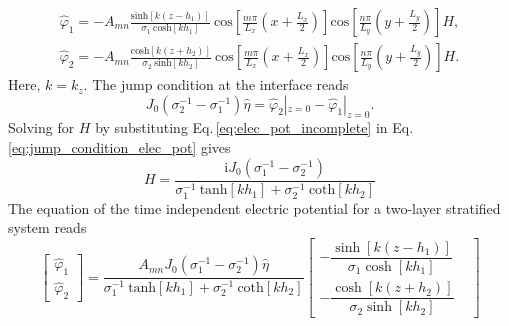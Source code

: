 \documentclass[aps,prfluids,reprint,superscriptaddress]{revtex4-2}
\newcommand{\ii}[1]{\text{#1}}
\begin{document}
\begin{equation}
	\begin{split}
		\widehat\varphi_1 = -A_{mn}\frac{\text{sinh}[k (z-h_1)]}{\sigma_1 \:\text{cosh}[kh_1]} \:\text{cos}\left[ \frac{m\pi}{L_x} \left( x+\frac{L_x}{2}\right)\right] \text{cos}\left[ \frac{n\pi}{L_y} \left( y+\frac{L_y}{2}\right)\right] H,
		\\ 
		\widehat\varphi_2 = -A_{mn}\frac{\text{cosh}[k (z+h_2)]}{\sigma_2 \:\text{sinh}[kh_2]} \:\text{cos}\left[ \frac{m\pi}{L_x} \left( x+\frac{L_x}{2}\right)\right] \text{cos}\left[ \frac{n\pi}{L_y} \left( y+\frac{L_y}{2}\right)\right] H.
	\end{split}
	\label{eq:elec_pot_incomplete}
\end{equation}
Here, $k = k_z$. The jump condition at the interface reads
\begin{equation}
	J_0(\sigma_2^{-1}-\sigma_1^{-1})\widehat\eta = \widehat\varphi_2|_{z=0}
	- \widehat\varphi_1|_{z=0}.
	\label{eq:jump_condition_elec_pot}
\end{equation}
Solving for $H$ by substituting Eq.\,\eqref{eq:elec_pot_incomplete} in Eq.\,\eqref{eq:jump_condition_elec_pot} gives
\begin{equation}
	H = \frac{\ii{i} J_0(\sigma_1^{-1} - \sigma_2^{-1})}{\sigma_1^{-1} \:\text{tanh}[kh_1] + \sigma_2^{-1} \:\text{coth}[kh_2]}
\end{equation}
The equation of the time independent electric potential for a two-layer stratified system reads
\begin{equation}
	\begin{bmatrix}
		\widehat{\varphi}_1 \\[12pt]
		\widehat{\varphi}_2 
	\end{bmatrix} = 
	\frac{A_{mn}J_0(\sigma_1^{-1} - \sigma_2^{-1})\widehat{\eta}}
	{\sigma_1^{-1} \:\text{tanh}[kh_1] + \sigma_2^{-1} \:\text{coth}[kh_2]}
	\left[
	\begin{array}{cc}
		-\dfrac{\sinh[k (z-h_1)]}{\sigma_1 \cosh[kh_1]} &
		\\[10pt]
		-\dfrac{\cosh[k (z+h_2)]}{\sigma_2 \sinh[kh_2]} & 
	\end{array} 
	\right]
\end{equation}
\end{document}
